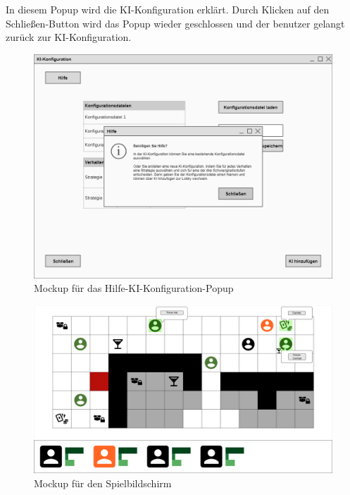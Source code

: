 In diesem Popup wird die KI-Konfiguration erklärt. Durch Klicken auf den Schließen-Button wird das Popup wieder geschlossen und der benutzer gelangt zurück zur KI-Konfiguration.

\begin{figure}[H]
  \centering
  \includegraphics[width=\textwidth]{Meilenstein03/Hilfe-KI-Konfiguration_Mockup.png}
  \caption{Mockup für das Hilfe-KI-Konfiguration-Popup}
\end{figure}


\begin{figure}[H]
  \centering
  \includegraphics[width=\textwidth]{Meilenstein03/Game_Mockup.png}
  \caption{Mockup für den Spielbildschirm}
\end{figure}
